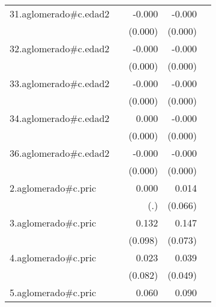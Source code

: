 {\begin{longtable}{l*{4}{D{.}{.}{-1}}}
\addlinespace
31.aglomerado#c.edad2&                     &      -0.000         &      -0.000         &                     \\
            &                     &     (0.000)         &     (0.000)         &                     \\
\addlinespace
32.aglomerado#c.edad2&                     &      -0.000         &      -0.000\sym{***}&                     \\
            &                     &     (0.000)         &     (0.000)         &                     \\
\addlinespace
33.aglomerado#c.edad2&                     &      -0.000         &      -0.000\sym{***}&                     \\
            &                     &     (0.000)         &     (0.000)         &                     \\
\addlinespace
34.aglomerado#c.edad2&                     &       0.000         &      -0.000         &                     \\
            &                     &     (0.000)         &     (0.000)         &                     \\
\addlinespace
36.aglomerado#c.edad2&                     &      -0.000         &      -0.000\sym{*}  &                     \\
            &                     &     (0.000)         &     (0.000)         &                     \\
\addlinespace
2.aglomerado#c.pric&                     &       0.000         &       0.014         &                     \\
            &                     &         (.)         &     (0.066)         &                     \\
\addlinespace
3.aglomerado#c.pric&                     &       0.132         &       0.147\sym{*}  &                     \\
            &                     &     (0.098)         &     (0.073)         &                     \\
\addlinespace
4.aglomerado#c.pric&                     &       0.023         &       0.039         &                     \\
            &                     &     (0.082)         &     (0.049)         &                     \\
\addlinespace
5.aglomerado#c.pric&                     &       0.060         &       0.090         &                     \\

\end{longtable}}
